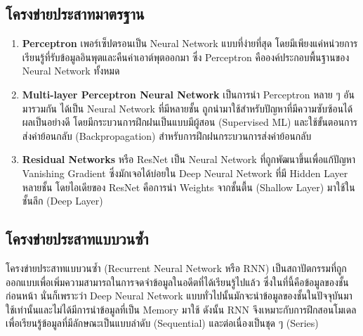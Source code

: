 \subsection{โครงข่ายประสาทมาตรฐาน}
\label{ssec:std_nn}

\begin{enumerate}[topsep=0pt,noitemsep]\setlength\itemsep{0.5em}
    \item \textbf{Perceptron} เพอร์เซ็ปตรอนเป็น Neural Network แบบที่ง่ายที่สุด โดยมีเพียงแค่หน่วยการเรียนรู้ที่รับข้อมูลอินพุตและคืนค่าเอาต์พุตออกมา ซึ่ง Perceptron คือองค์ประกอบพื้นฐานของ Neural Network ทั้งหมด

    \item \textbf{Multi-layer Perceptron Neural Network} เป็นการนำ Perceptron หลาย ๆ อันมารวมกัน ได้เป็น Neural Network ที่มีหลายชั้น ถูกนำมาใช้สำหรับปัญหาที่มีความซับซ้อนได้ผลเป็นอย่างดี โดยมีกระบวนการฝึกฝนเป็นแบบมีผู้สอน (Supervised ML) และใช้ขั้นตอนการส่งค่าย้อนกลับ (Backpropagation) สำหรับการฝึกฝนกระบวนการส่งค่าย้อนกลับ

    \item \textbf{Residual Networks} หรือ ResNet เป็น Neural Network ที่ถูกพัฒนาขึ้นเพื่อแก้ปัญหา Vanishing Gradient ซึ่งมักเจอได้บ่อยใน Deep Neural Network ที่มี Hidden Layer หลายชั้น โดยไอเดียของ ResNet คือการนำ Weights จากชั้นตื้น (Shallow Layer) มาใช้ในชั้นลึก (Deep Layer)
\end{enumerate}

\subsection{โครงข่ายประสาทแบบวนซ้ำ}
\label{ssec:rnn}

โครงข่ายประสาทแบบวนซ้ำ (Recurrent Neural Network หรือ RNN)\autocite{abiodun2018} เป็นสถาปัตกรรมที่ถูกออกแบบเพื่อเพิ่มความสามารถในการจดจำข้อมูลในอดีตที่ได้เรียนรู้ไปแล้ว ซึ่งในที่นี้คือข้อมูลของชั้นก่อนหน้า นั่นก็เพราะว่า Deep Neural Network แบบทั่วไปนั้นมักจะนำข้อมูลของชั้นในปัจจุบันมาใช้เท่านั้นและไม่ได้มีการนำข้อมูลที่เป็น Memory มาใช้ ดังนั้น RNN จึงเหมาะกับการฝึกสอนโมเดลเพื่อเรียนรู้ข้อมูลที่มีลักษณะเป็นแบบลำดับ (Sequential) และต่อเนื่องเป็นชุด ๆ (Series)

